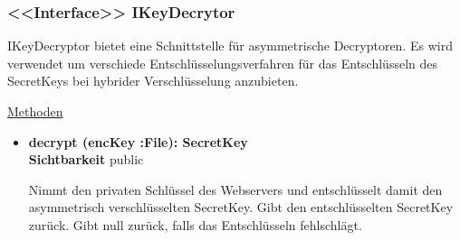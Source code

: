 \subsubsection{<<Interface>> IKeyDecrytor} \label{service:klasse:IKeyDecryptor}
IKeyDecryptor bietet eine Schnittstelle für asymmetrische Decryptoren. Es wird verwendet um verschiede Entschlüsselungsverfahren für das Entschlüsseln des SecretKeys bei hybrider Verschlüsselung anzubieten. \newline

\underline{Methoden}
\begin{itemize}
\itemsep0pt
\item \textbf{decrypt (encKey :File): SecretKey}\hfill\\
\textbf{Sichtbarkeit} public

Nimmt den privaten Schlüssel des Webservers und entschlüsselt damit den asymmetrisch verschlüsselten SecretKey. Gibt den entschlüsselten SecretKey zurück. Gibt null zurück, falls das Entschlüsseln fehlschlägt.

\end{itemize}